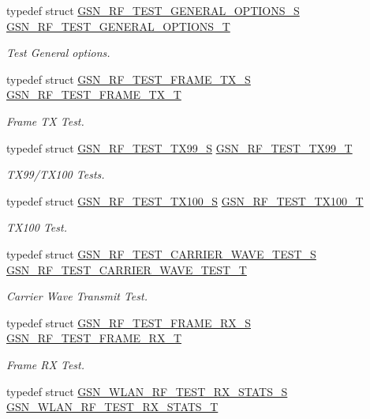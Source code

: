 \begin{DoxyCompactItemize}
typedef struct \hyperlink{a00188}{GSN\_\-RF\_\-TEST\_\-GENERAL\_\-OPTIONS\_\-S} \hyperlink{a00677_gadc69ae2ca627931231f38c5a07778b9a}{GSN\_\-RF\_\-TEST\_\-GENERAL\_\-OPTIONS\_\-T}
\begin{DoxyCompactList}\small\item\em Test General options. \end{DoxyCompactList}\item 
typedef struct \hyperlink{a00187}{GSN\_\-RF\_\-TEST\_\-FRAME\_\-TX\_\-S} \hyperlink{a00677_ga054447e13e32b5fdf1ba941142c3b8b8}{GSN\_\-RF\_\-TEST\_\-FRAME\_\-TX\_\-T}
\begin{DoxyCompactList}\small\item\em Frame TX Test. \end{DoxyCompactList}\item 
typedef struct \hyperlink{a00190}{GSN\_\-RF\_\-TEST\_\-TX99\_\-S} \hyperlink{a00677_gad6f744cc56ee1d2eefa8b1b733cacbe5}{GSN\_\-RF\_\-TEST\_\-TX99\_\-T}
\begin{DoxyCompactList}\small\item\em TX99/TX100 Tests. \end{DoxyCompactList}\item 
typedef struct \hyperlink{a00189}{GSN\_\-RF\_\-TEST\_\-TX100\_\-S} \hyperlink{a00677_ga69f7ed019cbe7d83cfe2cc5446cdab1a}{GSN\_\-RF\_\-TEST\_\-TX100\_\-T}
\begin{DoxyCompactList}\small\item\em TX100 Test. \end{DoxyCompactList}\item 
typedef struct \hyperlink{a00185}{GSN\_\-RF\_\-TEST\_\-CARRIER\_\-WAVE\_\-TEST\_\-S} \hyperlink{a00677_gae9bb588f7933f628f82d3351844e18f8}{GSN\_\-RF\_\-TEST\_\-CARRIER\_\-WAVE\_\-TEST\_\-T}
\begin{DoxyCompactList}\small\item\em Carrier Wave Transmit Test. \end{DoxyCompactList}\item 
typedef struct \hyperlink{a00186}{GSN\_\-RF\_\-TEST\_\-FRAME\_\-RX\_\-S} \hyperlink{a00677_gad57c6b5251e62dd07e194a52c90216ac}{GSN\_\-RF\_\-TEST\_\-FRAME\_\-RX\_\-T}
\begin{DoxyCompactList}\small\item\em Frame RX Test. \end{DoxyCompactList}\item 
typedef struct \hyperlink{a00419}{GSN\_\-WLAN\_\-RF\_\-TEST\_\-RX\_\-STATS\_\-S} \hyperlink{a00677_ga150fdf6ec3c7c370b27651412b36653a}{GSN\_\-WLAN\_\-RF\_\-TEST\_\-RX\_\-STATS\_\-T}

\end{DoxyCompactItemize}
